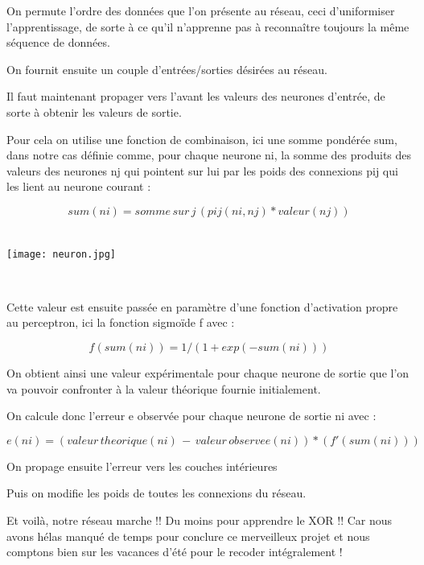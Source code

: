 \documentclass[a4paper,12pt]{report}
\begin{document}
On permute l'ordre des donn\'ees que l'on pr\'esente au r\'eseau, ceci
d'uniformiser l'apprentissage, de sorte \`a ce qu'il n'apprenne pas \`a reconna\^itre toujours la m\^eme
s\'equence de donn\'ees.

On fournit ensuite un couple d'entr\'ees/sorties d\'esir\'ees au
r\'eseau.

Il faut maintenant propager vers l'avant les valeurs des neurones
d'entr\'ee, de sorte \`a obtenir les valeurs de sortie.

Pour cela on utilise une fonction de combinaison, ici une somme
pond\'er\'ee sum, dans notre cas
d\'efinie comme, pour chaque neurone ni, la somme des produits des valeurs
des neurones nj qui pointent sur lui par les poids des connexions pij qui les
lient au neurone courant :

\[sum(ni) = somme\, sur\, j\, (pij(ni,nj)* valeur(nj))
\]%
\\

\begin{center}
	
	\texttt{[image: neuron.jpg]}\\
	\caption{\emph{Calcul de la sortie d'un neurone}}\\
\end{center}




Cette valeur est ensuite pass\'ee en param\`etre d'une fonction
d'activation propre au perceptron, ici la fonction sigmo\"ide f avec :  

\[f(sum(ni)) = 1/(1+exp(-sum(ni))) 
\]%

On obtient ainsi une valeur exp\'erimentale pour chaque neurone de
sortie que l'on va pouvoir confronter \`a la valeur th\'eorique fournie
initialement.

On calcule donc l'erreur e observ\'ee pour chaque neurone de sortie ni avec :

\[
	e(ni) = (valeur\, theorique(ni)\, -\, valeur\, observee(ni))*(f'(sum(ni)))
\]


On propage ensuite l'erreur vers les couches intérieures 

Puis on modifie les poids de toutes les connexions du réseau.

Et voilà, notre réseau marche !! Du moins pour apprendre le XOR !! Car
nous avons hélas manqué de temps pour conclure ce merveilleux projet et
nous comptons bien sur les vacances d'été pour le recoder intégralement
!
\end{document}
